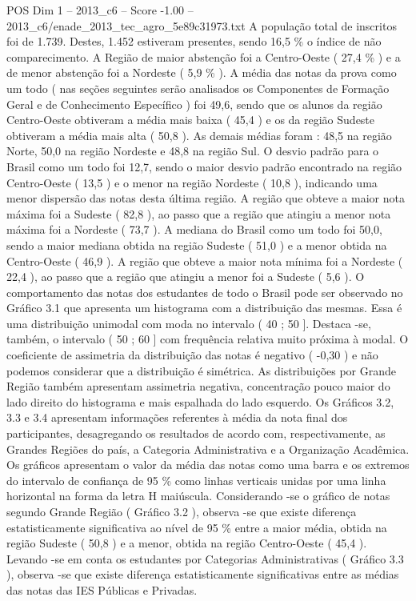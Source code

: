 \begin{textsample}{POS Dim 1 – 2013\_c6 – Score -1.00 – 2013\_c6/enade\_2013\_tec\_agro\_5e89c31973.txt}
A população total de inscritos foi de 1.739.
Destes, 1.452 estiveram presentes, sendo 16,5 \% o índice de não comparecimento.
A Região de maior abstenção foi a Centro-Oeste ( 27,4 \% ) e a de menor abstenção foi a Nordeste ( 5,9 \% ).
A média das notas da prova como um todo ( nas seções seguintes serão analisados os Componentes de Formação Geral e de Conhecimento Específico ) foi 49,6, sendo que os alunos da região Centro-Oeste obtiveram a média mais baixa ( 45,4 ) e os da região Sudeste obtiveram a média mais alta ( 50,8 ).
As demais médias foram : 48,5 na região Norte, 50,0 na região Nordeste e 48,8 na região Sul.
O desvio padrão para o Brasil como um todo foi 12,7, sendo o maior desvio padrão encontrado na região Centro-Oeste ( 13,5 ) e o menor na região Nordeste ( 10,8 ), indicando uma menor dispersão das notas desta última região.
A região que obteve a maior nota máxima foi a Sudeste ( 82,8 ), ao passo que a região que atingiu a menor nota máxima foi a Nordeste ( 73,7 ).
A mediana do Brasil como um todo foi 50,0, sendo a maior mediana obtida na região Sudeste ( 51,0 ) e a menor obtida na Centro-Oeste ( 46,9 ).
A região que obteve a maior nota mínima foi a Nordeste ( 22,4 ), ao passo que a região que atingiu a menor foi a Sudeste ( 5,6 ).
O comportamento das notas dos estudantes de todo o Brasil pode ser observado no Gráfico 3.1 que apresenta um histograma com a distribuição das mesmas.
Essa é uma distribuição unimodal com moda no intervalo ( 40 ; 50 ].
Destaca -se, também, o intervalo ( 50 ; 60 ] com frequência relativa muito próxima à modal.
O coeficiente de assimetria da distribuição das notas é negativo ( -0,30 ) e não podemos considerar que a distribuição é simétrica.
As distribuições por Grande Região também apresentam assimetria negativa, concentração pouco maior do lado direito do histograma e mais espalhada do lado esquerdo.
Os Gráficos 3.2, 3.3 e 3.4 apresentam informações referentes à média da nota final dos participantes, desagregando os resultados de acordo com, respectivamente, as Grandes Regiões do país, a Categoria Administrativa e a Organização Acadêmica.
Os gráficos apresentam o valor da média das notas como uma barra e os extremos do intervalo de confiança de 95 \% como linhas verticais unidas por uma linha horizontal na forma da letra H maiúscula.
Considerando -se o gráfico de notas segundo Grande Região ( Gráfico 3.2 ), observa -se que existe diferença estatisticamente significativa ao nível de 95 \% entre a maior média, obtida na região Sudeste ( 50,8 ) e a menor, obtida na região Centro-Oeste ( 45,4 ).
Levando -se em conta os estudantes por Categorias Administrativas ( Gráfico 3.3 ), observa -se que existe diferença estatisticamente significativas entre as médias das notas das IES Públicas e Privadas.

\end{textsample}

